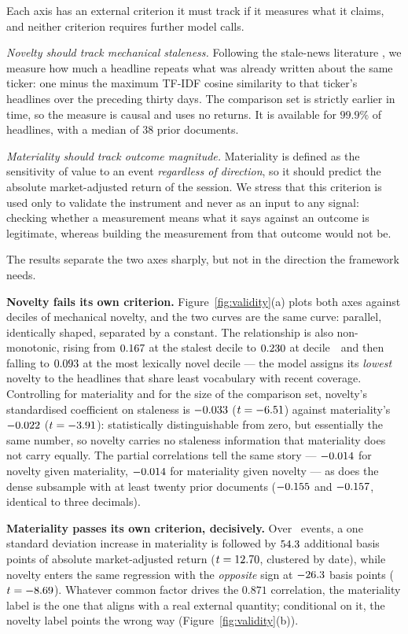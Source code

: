 Each axis has an external criterion it must track if it measures what it claims,
and neither criterion requires further model calls.

\emph{Novelty should track mechanical staleness.} Following the stale-news
literature \citep{tetlock2011}, we measure how much a headline repeats what was
already written about the same ticker: one minus the maximum TF-IDF cosine
similarity to that ticker's headlines over the preceding thirty days. The
comparison set is strictly earlier in time, so the measure is causal and uses no
returns. It is available for $99.9\%$ of headlines, with a median of 38 prior
documents.

\emph{Materiality should track outcome magnitude.} Materiality is defined as the
sensitivity of value to an event \emph{regardless of direction}, so it should
predict the absolute market-adjusted return of the session. We stress that this
criterion is used only to validate the instrument and never as an input to any
signal: checking whether a measurement means what it says against an outcome is
legitimate, whereas building the measurement from that outcome would not be.

The results separate the two axes sharply, but not in the direction the framework
needs.

\textbf{Novelty fails its own criterion.} Figure~\ref{fig:validity}(a) plots both
axes against deciles of mechanical novelty, and the two curves are the same curve:
parallel, identically shaped, separated by a constant. The relationship is also
non-monotonic, rising from $0.167$ at the stalest decile to $0.230$ at
decile~\NuPeakDecile\ and then falling to $0.093$ at the most lexically
novel decile --- the model assigns its \emph{lowest} novelty to the headlines that
share least vocabulary with recent coverage. Controlling for materiality and for
the size of the comparison set, novelty's standardised coefficient on staleness is
$-0.033$ ($t=-6.51$) against materiality's $-0.022$
($t=-3.91$): statistically distinguishable from zero, but essentially the same
number, so novelty carries no staleness information that materiality does not
carry equally. The partial correlations tell the same story --- $-0.014$
for novelty given materiality, $-0.014$ for materiality given novelty ---
as does the dense subsample with at least twenty prior documents
($-0.155$ and $-0.157$, identical to three decimals).

\textbf{Materiality passes its own criterion, decisively.} Over \AbsRetN\ events,
a one standard deviation increase in materiality is followed by
$54.3$ additional basis points of absolute market-adjusted return
($t=12.70$, clustered by date), while novelty enters the same regression with
the \emph{opposite} sign at $-26.3$ basis points ($t=-8.69$). Whatever
common factor drives the $0.871$ correlation, the materiality label is the one
that aligns with a real external quantity; conditional on it, the novelty label
points the wrong way (Figure~\ref{fig:validity}(b)).

